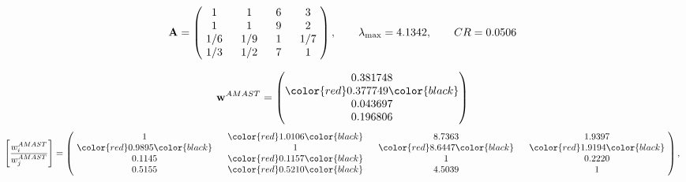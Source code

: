 \begin{example}
\begin{equation*}
\mathbf{A} =
\begin{pmatrix}
$\,\,$ 1 $\,\,$ & $\,\,$1$\,\,$ & $\,\,$6$\,\,$ & $\,\,$3 $\,\,$ \\
$\,\,$ 1 $\,\,$ & $\,\,$ 1 $\,\,$ & $\,\,$9$\,\,$ & $\,\,$2 $\,\,$ \\
$\,\,$ 1/6$\,\,$ & $\,\,$ 1/9$\,\,$ & $\,\,$ 1 $\,\,$ & $\,\,$ 1/7 $\,\,$ \\
$\,\,$ 1/3$\,\,$ & $\,\,$ 1/2$\,\,$ & $\,\,$7$\,\,$ & $\,\,$ 1  $\,\,$ \\
\end{pmatrix},
\qquad
\lambda_{\max} =
4.1342,
\qquad
CR = 0.0506
\end{equation*}

\begin{equation*}
\mathbf{w}^{AMAST} =
\begin{pmatrix}
0.381748\\
\color{red} 0.377749\color{black} \\
0.043697\\
0.196806
\end{pmatrix}\end{equation*}
\begin{equation*}
\left[ \frac{{w}^{AMAST}_i}{{w}^{AMAST}_j} \right] =
\begin{pmatrix}
$\,\,$ 1 $\,\,$ & $\,\,$\color{red} 1.0106\color{black} $\,\,$ & $\,\,$8.7363$\,\,$ & $\,\,$1.9397$\,\,$ \\
$\,\,$\color{red} 0.9895\color{black} $\,\,$ & $\,\,$ 1 $\,\,$ & $\,\,$\color{red} 8.6447\color{black} $\,\,$ & $\,\,$\color{red} 1.9194\color{black}   $\,\,$ \\
$\,\,$0.1145$\,\,$ & $\,\,$\color{red} 0.1157\color{black} $\,\,$ & $\,\,$ 1 $\,\,$ & $\,\,$0.2220 $\,\,$ \\
$\,\,$0.5155$\,\,$ & $\,\,$\color{red} 0.5210\color{black} $\,\,$ & $\,\,$4.5039$\,\,$ & $\,\,$ 1  $\,\,$ \\
\end{pmatrix},
\end{equation*}


\end{example}
